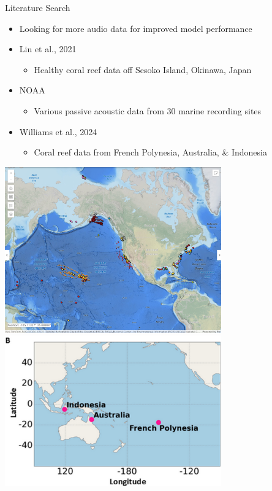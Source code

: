 \begin{frame}{Literature Search}
    \begin{itemize}
        \item Looking for more audio data for improved model performance
        \item Lin et al., 2021
        \begin{itemize}
            \item Healthy coral reef data off Sesoko Island, Okinawa, Japan
        \end{itemize}
        \item NOAA
        \begin{itemize}
            \item Various passive acoustic data from 30 marine recording sites
        \end{itemize}
        \item Williams et al., 2024
        \begin{itemize}
            \item Coral reef data from French Polynesia, Australia, \& Indonesia
        \end{itemize}
    \end{itemize}
    \includegraphics[height=0.4\textheight,width=0.7\textwidth,keepaspectratio]{images/aid_1.jpg}
    \includegraphics[height=0.4\textheight,width=0.7\textwidth,keepaspectratio]{images/aid_2.jpg}
\end{frame}

